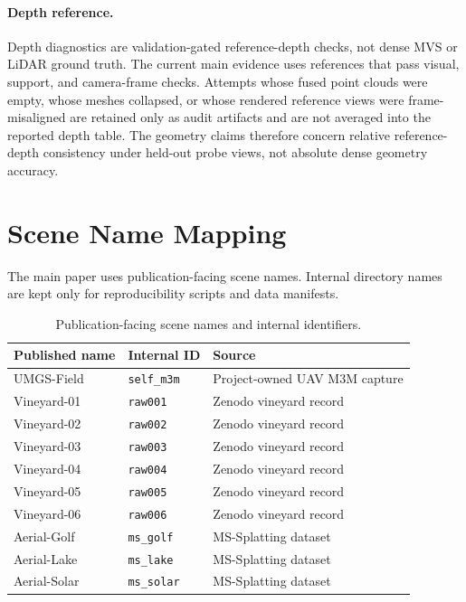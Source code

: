 ﻿\documentclass[acmtog,anonymous,review]{acmart}
\begin{document}
\paragraph{Depth reference.}
Depth diagnostics are validation-gated reference-depth checks, not dense MVS or LiDAR ground truth. The current main evidence uses references that pass visual, support, and camera-frame checks. Attempts whose fused point clouds were empty, whose meshes collapsed, or whose rendered reference views were frame-misaligned are retained only as audit artifacts and are not averaged into the reported depth table. The geometry claims therefore concern relative reference-depth consistency under held-out probe views, not absolute dense geometry accuracy.


\section{Scene Name Mapping}

The main paper uses publication-facing scene names. Internal directory names are kept only for reproducibility scripts and data manifests.

\begin{table}[h]
    \caption{Publication-facing scene names and internal identifiers.}
    \label{tab:supp-scene-mapping}
    \centering
    \scriptsize
    \begin{tabular}{lll}
        \toprule
        Published name & Internal ID & Source \\
        \midrule
        UMGS-Field & \texttt{self\_m3m} & Project-owned UAV M3M capture \\
        Vineyard-01 & \texttt{raw001} & Zenodo vineyard record \\
        Vineyard-02 & \texttt{raw002} & Zenodo vineyard record \\
        Vineyard-03 & \texttt{raw003} & Zenodo vineyard record \\
        Vineyard-04 & \texttt{raw004} & Zenodo vineyard record \\
        Vineyard-05 & \texttt{raw005} & Zenodo vineyard record \\
        Vineyard-06 & \texttt{raw006} & Zenodo vineyard record \\
        Aerial-Golf & \texttt{ms\_golf} & MS-Splatting dataset \\
        Aerial-Lake & \texttt{ms\_lake} & MS-Splatting dataset \\
        Aerial-Solar & \texttt{ms\_solar} & MS-Splatting dataset \\
        \bottomrule
    \end{tabular}
\end{table}
\end{document}
